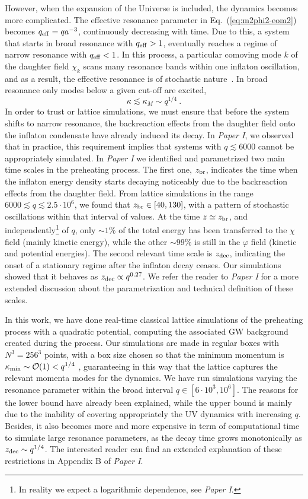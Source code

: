 \documentclass[a4paper,11pt]{article}
\newcommand{\be}{\begin{equation}}
\newcommand{\ee}{\end{equation}}
\begin{document}
However, when the expansion of the Universe is included, the dynamics becomes more complicated. The effective resonance parameter in Eq.~(\ref{eq:m2phi2-eom2}) becomes $q_{\rm eff} = q a^{-3}$, continuously decreasing with time. Due to this, a system that starts in broad resonance with $q_{\rm eff} > 1$, eventually reaches a regime of narrow resonance with $q_{\rm eff} < 1$. In this process, a particular comoving mode $k$ of the daughter field $\chi_k$ scans many resonance bands within one inflaton oscillation, and as a result, the effective resonance is of stochastic nature~\cite{Kofman:1997yn}. In broad resonance only modes below a given cut-off are excited,
\be\label{eq:kM} \kappa \lesssim \kappa_M \sim q^{1/4} \ .\ee
In order to trust or lattice simulations, we must ensure that before the system shifts to narrow resonance, the backreaction effects from the daughter field onto the inflaton condensate have already induced its decay. In \textit{Paper I}, we observed that in practice, this requirement implies that systems with $q \lesssim 6000$ cannot be appropriately simulated. In {\it Paper I} we identified and parametrized two main time scales in the preheating process. The first one, $z_{\rm br}$, indicates the time when the inflaton energy density starts decaying noticeably due to the backreaction effects from the daughter field. From lattice simulations in the range $6000 \lesssim q \lesssim 2.5 \cdot 10^6$, we found that $z_{\rm br} \in [40,130]$, with a pattern of stochastic oscillations within that interval of values. At the time $z \simeq z_{\rm br}$, and independently\footnote{In reality we expect a logarithmic dependence, see {\it Paper I}.} of $q$, only $\sim 1\%$ of the total energy has been transferred to the $\chi$ field (mainly kinetic energy), while the other $\sim 99 \%$ is still in the $\varphi$ field (kinetic and potential energies). The second relevant time scale is $z_{\rm dec}$, indicating the onset of a stationary regime after the inflaton decay ceases. Our simulations showed that it behaves as $z_{\rm dec} \propto q^{0.27}$. We refer the reader to {\it Paper I} for a more extended discussion about the parametrization and technical definition of these scales.

In this work, we have done real-time classical lattice simulations of the preheating process with a quadratic potential, computing the associated GW background created during the process. Our simulations are made in regular boxes with $N^3 = 256^3$ points, with a box size chosen so that the minimum momentum is $\kappa_{\rm min} \sim \mathcal{O} (1) < q^{1/4}$ , guaranteeing in this way that the lattice captures the relevant momenta modes for the dynamics. We have run simulations varying the resonance parameter within the broad interval $q \in [6 \cdot 10^3, 10^6]$. The reasons for the lower bound have already been explained, while the upper bound is mainly due to the inability of covering appropriately the UV dynamics with increasing $q$. Besides, it also becomes more and more expensive in term of computational time to simulate large resonance parameters, as the decay time grows monotonically as $z_{\rm dec} \sim q^{1/4}$. The interested reader can find an extended explanation of these restrictions in Appendix B of {\it Paper I}.
\end{document}
